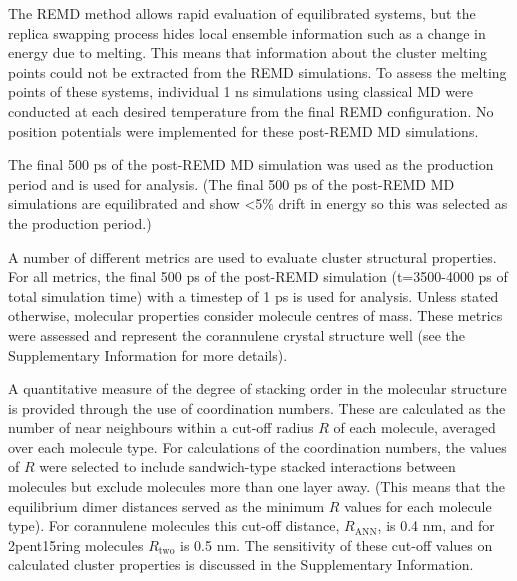 The REMD method allows rapid evaluation of equilibrated systems, but the replica swapping process hides local ensemble information such as a change in energy due to melting. This means that information about the cluster melting points could not be extracted from the REMD simulations. To assess the melting points of these systems, individual 1 ns simulations using classical MD were conducted at each desired temperature from the final REMD configuration. No position potentials were implemented for these post-REMD MD simulations.

The final 500 ps of the post-REMD MD simulation was used as the production period and is used for analysis.
(The final 500 ps of the post-REMD MD simulations are equilibrated and show <5\% drift in energy so this was selected as the production period.)

A number of different metrics are used to evaluate cluster structural properties. For all metrics, the final 500 ps of the post-REMD simulation (t=3500-4000 ps of total simulation time) with a timestep of 1 ps is used for analysis. Unless stated otherwise, molecular properties consider molecule centres of mass.
These metrics were assessed and represent the corannulene crystal structure well (see the Supplementary Information for more details).

A quantitative measure of the degree of stacking order in the molecular structure is provided through the use of coordination numbers. These are calculated as the number of near neighbours within a cut-off radius $R$ of each molecule, averaged over each molecule type. 
For calculations of the coordination numbers, the values of $R$ were selected to include sandwich-type stacked interactions between molecules but exclude molecules more than one layer away. (This means that the equilibrium dimer distances served as the minimum $R$ values for each molecule type). For corannulene molecules this cut-off distance, $R_{\text{ANN}}$, is 0.4 nm, and for 2pent15ring molecules $R_{\text{two}}$ is 0.5 nm.  
The sensitivity of these cut-off values on calculated cluster properties is discussed in the Supplementary Information.

